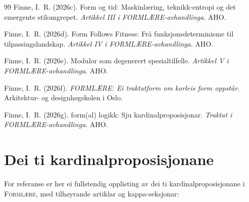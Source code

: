 \documentclass[12pt,a4paper,oneside]{report}
\begin{document}
\begin{thebibliography}{99}
Finne, I.~R. (2026c).
Form og tid: Maskinlæring, teknikk-entropi og det emergente stilomgrepet.
\textit{Artikkel III i FORMLÆRE-avhandlinga}. AHO.

Finne, I.~R. (2026d).
Form Follows Fitness: Frå funksjonsdeterminisme til tilpassingslandskap.
\textit{Artikkel IV i FORMLÆRE-avhandlinga}. AHO.

Finne, I.~R. (2026e).
Modulor som degenerert spesialtilfelle.
\textit{Artikkel V i FORMLÆRE-avhandlinga}. AHO.

Finne, I.~R. (2026f).
\textit{FORMLÆRE: Ei traktatform om korleis form oppstår}.
Arkitektur- og designhøgskolen i Oslo.

Finne, I.~R. (2026g).
form(al) logikk: Sju kardinalproposisjonar.
\textit{Traktat i FORMLÆRE-avhandlinga}. AHO.

\end{thebibliography}

\appendix
\chapter{Dei ti kardinalproposisjonane}
\label{app:proposisjonar}

For referanse er her ei fullstendig opplisting av dei ti kardinalproposisjonane i \textsc{Formlære}, med tilhøyrande artiklar og kappa-seksjonar:
\end{document}
